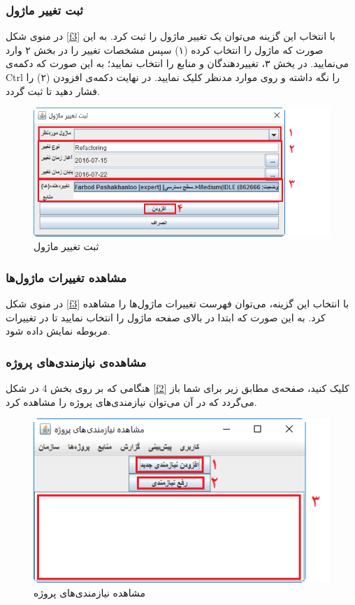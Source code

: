 \subsubsection{ثبت تغییر ماژول}
در منوی شکل
\ref{f3}
با انتخاب این گزینه می‌توان یک تغییر ماژول را ثبت کرد. به این صورت که ماژول را انتخاب کرده (۱)  سپس مشخصات تغییر را در بخش ۲ وارد می‌نمایید. در یخش ۳، تغییردهندگان و منابع را انتخاب نمایید؛ به این صورت که دکمه‌ی Ctrl را نگه داشته و روی موارد مدنظر کلیک نمایید. در نهایت دکمه‌ی افزودن  (۲)  را فشار دهید تا ثبت گردد.
\begin{figure}[H]
	\centering
	\includegraphics[scale=0.8]{img/manual/submitMM}
	\caption{ثبت تغییر ماژول}
\end{figure}

\subsubsection{مشاهده تغییرات ماژول‌ها}
در منوی شکل
\ref{f3}
با انتخاب این گزینه، می‌توان فهرست تغییرات ماژول‌ها را مشاهده کرد. به این صورت که ابتدا در بالای صفحه ماژول را انتخاب نمایید تا در تغییرات مربوطه نمایش داده شود.

\subsubsection{مشاهده‌ی نیازمندی‌های پروژه}

هنگامی که بر روی بخش 4 در شکل
\ref{f2}
کلیک کنید، صفحه‌ی مطابق زیر برای شما باز می‌گردد که در آن می‌توان نیازمندی‌های پروژه را مشاهده کرد.

\begin{figure}[H]
	\centering
	\includegraphics[scale=0.7]{img/manual/viewPrjReqs}
	\caption{مشاهده نیازمندی‌های پروژه}
	\label{f102}
\end{figure}


